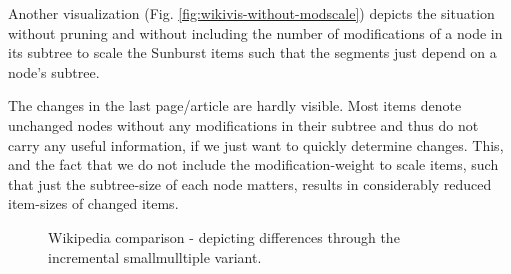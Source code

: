 Another visualization (Fig. \ref{fig:wikivis-without-modscale}) depicts the situation without pruning and without including the number of modifications of a node in its subtree to scale the Sunburst items such that the segments just depend on a node's subtree.

The changes in the last page/article are hardly visible. Most items denote unchanged nodes without any modifications in their subtree and thus do not carry any useful information, if we just want to quickly determine changes. This, and the fact that we do not include the modification-weight to scale items, such that just the subtree-size of each node matters, results in considerably reduced item-sizes of changed items.

\begin{figure}[tb]
\caption{\label{fig:wikipedia-incremental} Wikipedia comparison - depicting differences through the incremental smallmulltiple variant.}
\end{figure}


